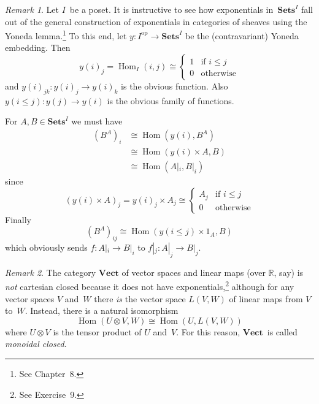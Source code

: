 \documentclass[letterpaper,12pt]{article}
\newcommand{\R}{\mathbb{R}}
\newcommand{\iso}{\cong}
\newcommand{\tprod}{\otimes}
\DeclareMathOperator{\Hom}{Hom}
\newcommand{\cat}[1]{\mathbf{#1}}
\newcommand{\dual}[1]{#1^{\mathrm{op}}}
\newcommand{\2}{\cat{2}}
\newcommand{\Sets}{\cat{Sets}}
\newcommand{\Vect}{\cat{Vect}}
\theoremstyle{definition}
\theoremstyle{remark}
\newtheorem*{rmk}{Remark}
\theoremstyle{direction}
\begin{document}
\begin{rmk}
Let \(I\)~be a poset. It is instructive to see how exponentials in~\(\Sets^I\) fall out of the general construction of exponentials in categories of sheaves using the Yoneda lemma.\footnote{See Chapter~8.} To this end, let \(y:\dual{I}\to\Sets^I\) be the (contravariant) Yoneda embedding. Then
\[y(i)_j=\Hom_I(i,j)\iso\begin{cases}
1&\text{if }i\le j\\
0&\text{otherwise}
\end{cases}\]
and \(y(i)_{jk}:y(i)_j\to y(i)_k\) is the obvious function. Also \(y(i\le j):y(j)\to y(i)\) is the obvious family of functions.

For \(A,B\in\Sets^I\) we must have
\begin{align*}
(B^A)_i&\iso\Hom(y(i),B^A)\\
	&\iso\Hom(y(i)\times A,B)\\
	&\iso\Hom(A|_i,B|_i)
\end{align*}
since
\[(y(i)\times A)_j=y(i)_j\times A_j\iso\begin{cases}
A_j&\text{if }i\le j\\
0&\text{otherwise}
\end{cases}\]
Finally
\[(B^A)_{ij}\iso\Hom(y(i\le j)\times 1_A,B)\]
which obviously sends \(f:A|_i\to B|_i\) to \(f|_j:A|_j\to B|_j\).
\end{rmk}

\begin{rmk}
The category \(\Vect\) of vector spaces and linear maps (over \(\R\), say) is \emph{not} cartesian closed because it does not have exponentials,\footnote{See Exercise~9.} although for any vector spaces \(V\) and~\(W\) there \emph{is} the vector space \(L(V,W)\) of linear maps from \(V\) to~\(W\). Instead, there is a natural isomorphism
\[\Hom(U\tprod V,W)\iso\Hom(U,L(V,W))\]
where \(U\tprod V\) is the tensor product of \(U\) and~\(V\). For this reason, \(\Vect\)~is called \emph{monoidal closed}.
\end{rmk}
\end{document}
